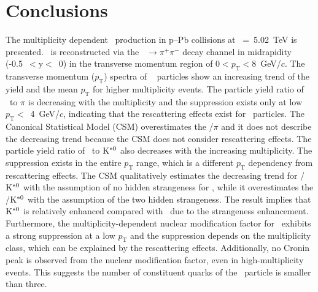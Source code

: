 
\section{Conclusions}
\label{sec:summary}

The multiplicity dependent \fzero~production in p--Pb collisions at \snn~=~5.02~TeV is presented. \fzero~is reconstructed via the \fzero~$\rightarrow\pi^{+}\pi^{-}$ decay channel in midrapidity (-0.5~$<\mathrm{y}<$~0) in the transverse momentum region of $0<p_{\mathrm{T}}<8$~GeV/$c$.
The transverse momentum ($p_{\mathrm{T}}$) spectra of \fzero~ particles show an increasing trend of the yield and the mean $p_{\mathrm{T}}$ for higher multiplicity events. The particle yield ratio of \fzero~to $\pi$ is decreasing with the multiplicity and the suppression exists only at low $p_{\mathrm{T}}<$~4~GeV/$c$, indicating that the rescattering effects exist for \fzero~particles. The Canonical Statistical Model (CSM) overestimates the \fzero/$\pi$ and it does not describe the decreasing trend because the CSM does not consider rescattering effects. The particle yield ratio of \fzero~to $\rm{}K^{*0}$ also decreases with the increasing multiplicity. The suppression exists in the entire $p_{\mathrm{T}}$ range, which is a different $p_{\mathrm{T}}$ dependency from rescattering effects. The CSM qualitatively estimates the decreasing trend for \fzero/$\rm{}K^{*0}$ with the assumption of no hidden strangeness for \fzero, while it overestimates the \fzero/$\rm{}K^{*0}$ with the assumption of the two hidden strangeness. The result implies that $\rm{}K^{*0}$ is relatively enhanced compared with \fzero~due to the strangeness enhancement. Furthermore, the multiplicity-dependent nuclear modification factor for \fzero~exhibits a strong suppression at a low $p_{\mathrm{T}}$ and the suppression depends on the multiplicity class, which can be explained by the rescattering effects. Additionally, no Cronin peak is observed from the nuclear modification factor, even in high-multiplicity events. This suggests the number of constituent quarks of the \fzero~particle is smaller than three.